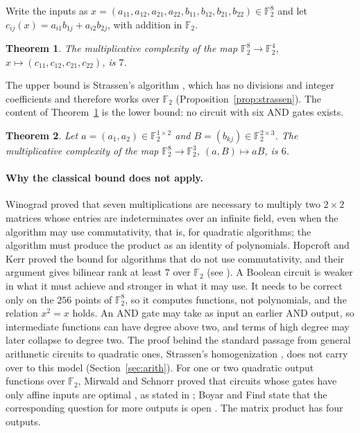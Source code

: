 \documentclass[11pt,a4paper]{article}
\newtheorem{theorem}{Theorem}[section]
\theoremstyle{definition}
\newcommand{\F}{\mathbb{F}}
\begin{document}
Write the inputs as $x=(a_{11},a_{12},a_{21},a_{22},b_{11},b_{12},b_{21},b_{22})\in\F_2^8$ and let $c_{ij}(x)=a_{i1}b_{1j}+a_{i2}b_{2j}$, with addition in $\F_2$.

\begin{theorem}\label{thm:main}
The multiplicative complexity of the map $\F_2^8\to\F_2^4$, $x\mapsto(c_{11},c_{12},c_{21},c_{22})$, is $7$.
\end{theorem}

The upper bound is Strassen's algorithm \cite{Strassen69}, which has no divisions and integer coefficients and therefore works over $\F_2$ (Proposition~\ref{prop:strassen}). The content of Theorem~\ref{thm:main} is the lower bound: no circuit with six AND gates exists.

\begin{theorem}\label{thm:123}
Let $a=(a_1,a_2)\in\F_2^{1\times2}$ and $B=(b_{kj})\in\F_2^{2\times3}$. The multiplicative complexity of the map $\F_2^8\to\F_2^3$, $(a,B)\mapsto aB$, is $6$.
\end{theorem}

\paragraph{Why the classical bound does not apply.} Winograd \cite{Winograd71} proved that seven multiplications are necessary to multiply two $2\times2$ matrices whose entries are indeterminates over an infinite field, even when the algorithm may use commutativity, that is, for quadratic algorithms; the algorithm must produce the product as an identity of polynomials. Hopcroft and Kerr \cite{HopcroftKerr71} proved the bound for algorithms that do not use commutativity, and their argument gives bilinear rank at least $7$ over $\F_2$ (see \cite[\S1.1]{Wang26}). A Boolean circuit is weaker in what it must achieve and stronger in what it may use. It needs to be correct only on the $256$ points of $\F_2^8$, so it computes functions, not polynomials, and the relation $x^2=x$ holds. An AND gate may take as input an earlier AND output, so intermediate functions can have degree above two, and terms of high degree may later collapse to degree two. The proof behind the standard passage from general arithmetic circuits to quadratic ones, Strassen's homogenization \cite{Strassen73}, does not carry over to this model (Section~\ref{sec:arith}). For one or two quadratic output functions over $\F_2$, Mirwald and Schnorr proved that circuits whose gates have only affine inputs are optimal \cite{MirwaldSchnorr92}, as stated in \cite[\S2.1]{BoyarFind18}; Boyar and Find state that the corresponding question for more outputs is open \cite[\S5]{BoyarFind18}. The matrix product has four outputs.
\end{document}
